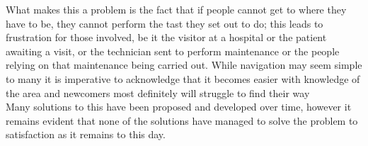 What makes this a problem is the fact that if people cannot get to where they have to be, they cannot perform the tast they set out to do; this leads to frustration for those involved, be it the visitor at a hospital or the patient awaiting a visit, or the technician sent to perform maintenance or the people relying on that maintenance being carried out. While navigation may seem simple to many it is imperative to acknowledge that it becomes easier with knowledge of the area and newcomers most definitely will struggle to find their way \\
Many solutions to this have been proposed and developed over time, however it remains evident that none of the solutions have managed to solve the problem to satisfaction as it remains to this day.
